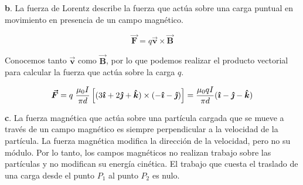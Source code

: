 \textbf{b}. La fuerza de Lorentz describe la fuerza que actúa sobre una carga puntual en movimiento en presencia de un campo magnético.

\begin{equation*}
    \boldsymbol{\vec{F}} = q \boldsymbol{\vec{v}} \times \boldsymbol{\vec{B}}
\end{equation*}

Conocemos tanto $\boldsymbol{\vec{v}}$ como $\boldsymbol{\vec{B}}$, por lo que podemos realizar el producto vectorial para calcular la fuerza
que actúa sobre la carga $q$.

\begin{equation*}
    \boldsymbol{\vec{F}} = q \; \frac{\mu_{0} I}{\pi d} \left[(3 \boldsymbol{\hat{\imath}}
    + 2 \boldsymbol{\hat{\jmath}}  + \boldsymbol{\hat{k}})  \times \left( -\boldsymbol{\hat{\imath}} -\boldsymbol{\hat{\jmath}} \right)  \right] =
    \frac{\mu_{0} q I}{\pi d} (\boldsymbol{\hat{\imath}} - \boldsymbol{\hat{\jmath}} - \boldsymbol{\hat{k}} )
\end{equation*}

\textbf{c}. La fuerza magnética que actúa sobre una partícula cargada que se mueve a través de un campo magnético es siempre perpendicular a la
velocidad de la partícula. La fuerza magnética modifica la dirección de la velocidad, pero no su módulo. Por lo tanto,
los campos magnéticos no realizan trabajo sobre las partículas y no modifican su energía cinética. El trabajo que cuesta el traslado
de una carga desde el punto $P_1$ al punto $P_2$ es nulo.